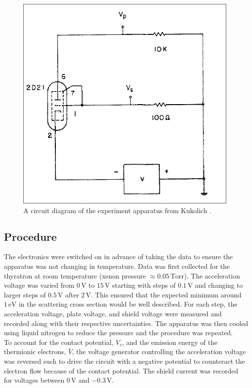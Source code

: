 \documentclass[%
reprint,
amsmath,amssymb,
aps,
floatfix
]{revtex4-2}
\begin{document}
	\begin{figure}
		\includegraphics[width=0.85\columnwidth]{ramsauerCircuit.png}
		\caption{\label{fig:circuit}A circuit diagram of the experiment apparatus from Kukolich \cite{kukolich}.}
	\end{figure}
	
	\subsection{Procedure}
	The electronics were switched on in advance of taking the data to ensure the apparatus was not changing in temperature. Data was first collected for the thyratron at room temperature (xenon pressure $\approx 0.05 \,\text{Torr}$). The acceleration voltage was varied from $0 \,\text{V}$ to $15 \,\text{V}$ starting with steps of $0.1 \,\text{V}$ and changing to larger steps of $0.5 \,\text{V}$ after $2 \,\text{V}$. This ensured that the expected minimum around $1 \,\text{eV}$ in the scattering cross section would be well described. For each step, the acceleration voltage, plate voltage, and shield voltage were measured and recorded along with their respective uncertainties. The apparatus was then cooled using liquid nitrogen to reduce the pressure and the procedure was repeated.\\
	
	To account for the contact potential, $V_c$, and the emission energy of the thermionic electrons, $\bar{V}$, the voltage generator controlling the acceleration voltage was reversed such to drive the circuit with a negative potential to counteract the electron flow because of the contact potential. The shield current was recorded for voltages between $0 \,\text{V}$ and $-0.3 \,\text{V}$.
	
\end{document}

